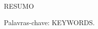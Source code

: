 \setlength{\absparsep}{18pt} %
\begin{resumo}

\noindent RESUMO

\noindent Palavras-chave: KEYWORDS.
\end{resumo}